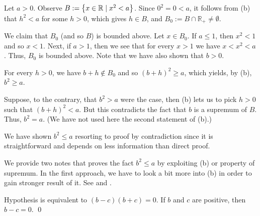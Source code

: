 \documentclass[a4paper,12pt]{article}
\begin{document}
\begin{sol}
	Let
	\( a>0\).
	Observe
	\( B:=\left\{  x \in \mathbb{R} \;|\; x^2 <a \right\} \).
	Since
	\( 0^2=0<a \),
	it follows from (b) that
	\( h^2 <a \)
	for some
	\( h>0 \),
	which gives
	\( h \in B \),
	and
	\( B_0:=B \cap \mathbb{R}_{+} \neq \emptyset \).
	
	We claim that
	\( B_0 \)
	(and so \( B \))
	is bounded above.
	Let \(  x \in B_0 \).
	If
	\( a\le1 \),
	then
	\( x^2 < 1 \)
	and so
	\( x < 1 \).
	Next, if
	\( a>1 \),
	then
	we see that for every
	\( x > 1 \)
	we have
	\( x<x^2<a \).
	Thus, \( B_0 \)
	is bounded above.
	Note that we have also shown that  \( b>0 \).
	
	For every
	\( h>0 \),
	we have
	\( b+h \notin B_0 \)
	and so
	\( (b+h)^2 \ge a \),
	which yields, by (b),
	\( b^2 \ge a \).
	
	Suppose, to the contrary, that
	\( b^2 >a \)
	were the case,
	then (b) lets us to pick
	\( h>0 \)
	such that
	\( (b+h)^2 < a \).
	But this contradicts the fact that
	\( b \)
	is a supremum of
	\( B \).
	Thus,
	\( b^2 =a \).
	(We have not used here the second statement of (b).)
	
	We have shown \( b^2 \le a \) resorting to proof by contradiction since it is straightforward and depends on less information than direct proof.
	
	We provide two notes that proves the fact
	\( b^2 \le a \)
	by exploiting (b) or property of supremum.
	In the first approach, we have to look a bit more into (b) in order to gain stronger result of it.
	See 
	and
	.
	
	Hypothesis is equivalent to 
	\( (b-c)(b+c)=0 \).
	If
	\( b \)
	and
	\( c \)
	are positive,
	then
	\( b-c =0 \).
	\qed\end{sol}
\end{document}
